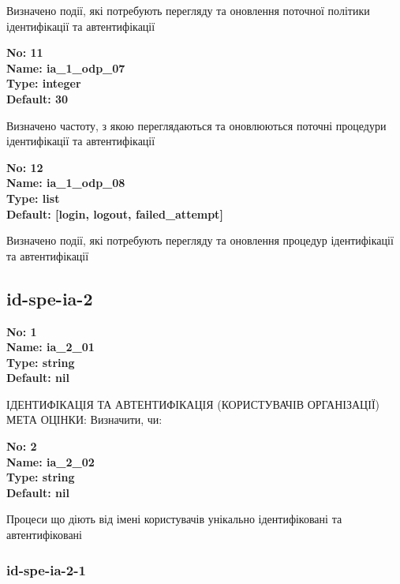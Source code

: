 \documentclass{article}
\begin{document}
{\footnotesize Визначено події, які потребують перегляду та оновлення поточної політики ідентифікації та автентифікації}


{\footnotesize\bfseries
No: 11\\
Name: ia\_\allowbreak{}1\_\allowbreak{}odp\_\allowbreak{}07\\
Type: integer\\
Default: 30
}

{\footnotesize Визначено частоту, з якою переглядаються та оновлюються поточні процедури ідентифікації та автентифікації}


{\footnotesize\bfseries
No: 12\\
Name: ia\_\allowbreak{}1\_\allowbreak{}odp\_\allowbreak{}08\\
Type: list\\
Default: [\textquotedbl{}login\textquotedbl{}, \textquotedbl{}logout\textquotedbl{}, \textquotedbl{}failed\_\allowbreak{}attempt\textquotedbl{}]
}

{\footnotesize Визначено події, які потребують перегляду та оновлення процедур ідентифікації та автентифікації}




\subsection{id-spe-ia-2}


\vspace{10pt}
{\footnotesize\bfseries
No: 1\\
Name: ia\_\allowbreak{}2\_\allowbreak{}01\\
Type: string\\
Default: nil
}

{\footnotesize ІДЕНТИФІКАЦІЯ ТА АВТЕНТИФІКАЦІЯ (КОРИСТУВАЧІВ ОРГАНІЗАЦІЇ) МЕТА ОЦІНКИ: Визначити, чи:}


{\footnotesize\bfseries
No: 2\\
Name: ia\_\allowbreak{}2\_\allowbreak{}02\\
Type: string\\
Default: nil
}

{\footnotesize Процеси що діють від імені користувачів унікально ідентифіковані та автентифіковані}




\subsubsection{id-spe-ia-2-1}
\end{document}

